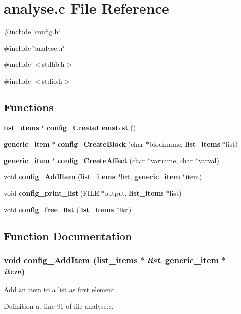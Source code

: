 \section{analyse.c File Reference}
\label{analyse_8c}
{\ttfamily \#include \char`\"{}config.h\char`\"{}}\par
{\ttfamily \#include \char`\"{}analyse.h\char`\"{}}\par
{\ttfamily \#include $<$stdlib.h$>$}\par
{\ttfamily \#include $<$stdio.h$>$}\par
\subsection*{Functions}
\begin{DoxyCompactItemize}
\item 
{\bf list\_\-items} $\ast$ {\bf config\_\-CreateItemsList} ()
\item 
{\bf generic\_\-item} $\ast$ {\bf config\_\-CreateBlock} (char $\ast$blockname, {\bf list\_\-items} $\ast$list)
\item 
{\bf generic\_\-item} $\ast$ {\bf config\_\-CreateAffect} (char $\ast$varname, char $\ast$varval)
\item 
void {\bf config\_\-AddItem} ({\bf list\_\-items} $\ast$list, {\bf generic\_\-item} $\ast$item)
\item 
void {\bf config\_\-print\_\-list} (FILE $\ast$output, {\bf list\_\-items} $\ast$list)
\item 
void {\bf config\_\-free\_\-list} ({\bf list\_\-items} $\ast$list)
\end{DoxyCompactItemize}


\subsection{Function Documentation}
\subsubsection[{config\_\-AddItem}]{\setlength{\rightskip}{0pt plus 5cm}void config\_\-AddItem ({\bf list\_\-items} $\ast$ {\em list}, \/  {\bf generic\_\-item} $\ast$ {\em item})}\label{analyse_8c_a4f7005314a823e91e222533981b18286}
Add an item to a list as first element 

Definition at line 91 of file analyse.c.
